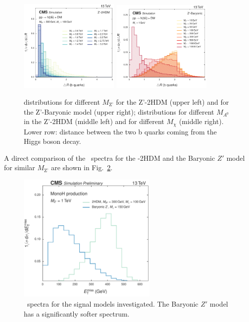 \begin{figure}[htbp]
   \includegraphics[width=0.43\textwidth]{figures/models/bbdR_signals_2hdm.pdf}
   \includegraphics[width=0.43\textwidth]{figures/models/bbdR_signals_barzp.pdf}\\
   \caption{\ptmiss distributions  for different $M_{\text{Z'}}$ for the Z'-2HDM (upper left) and for the Z'-Baryonic model (upper right); \ptmiss distributions for different $M_{A^0}$ in the Z'-2HDM (middle left) and for different $M_\chi$ (middle right). Lower row: distance between the two b quarks coming from the Higgs boson decay.}
   \label{fig:puppimet_models}
\end{figure}


A direct comparison of the \MET~spectra for the \cPZpr-2HDM and the Baryonic $Z'$ model for similar $M_{\text{Z'}}$ are shown in Fig.~\ref{fig:puppimet_signals}.

\begin{figure}
   \centering
   \includegraphics[width=0.6\textwidth]{figures/puppimet_signals.pdf}
   \caption{\ETslash~spectra for the signal models investigated. The Baryonic $Z'$ model has a significantly softer spectrum.}
   \label{fig:puppimet_signals}
\end{figure}
